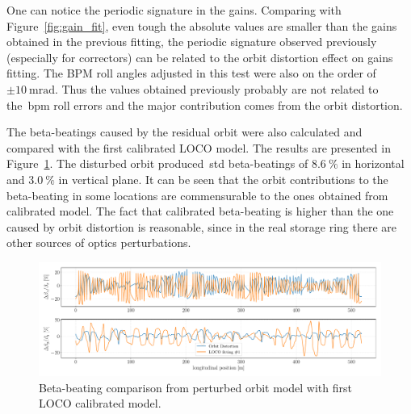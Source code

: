 One can notice the periodic signature in the gains. Comparing with Figure~\ref{fig:gain_fit}, even tough the absolute values are smaller than the gains obtained in the previous fitting, the periodic signature observed previously (especially for correctors) can be related to the orbit distortion effect on gains fitting. The BPM roll angles adjusted in this test were also on the order of $\pm\SI{10}{\milli\radian}$. Thus the values obtained previously probably are not related to the~\gls{bpm} roll errors and the major contribution comes from the orbit distortion.

The beta-beatings caused by the residual orbit were also calculated and compared with the first calibrated LOCO model. The results are presented in Figure~\ref{fig:beta_beating_orb}. The disturbed orbit produced~\gls{std} beta-beatings of $\SI{8.6}{\%}$ in horizontal and $\SI{3.0}{\%}$ in vertical plane. It can be seen that the orbit contributions to the beta-beating in some locations are commensurable to the ones obtained from calibrated model. The fact that calibrated beta-beating is higher than the one caused by orbit distortion is reasonable, since in the real storage ring there are other sources of optics perturbations. 
\begin{figure}[h!]
\centering
\includegraphics[width=1.0\textwidth]{figures/beta_beating_orbit_loco_iter0.pdf}
\caption{Beta-beating comparison from perturbed orbit model with first LOCO calibrated model.}
\label{fig:beta_beating_orb}
\end{figure}

